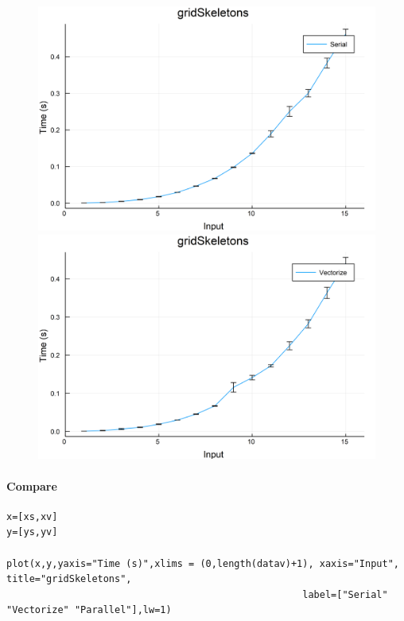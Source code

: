 \documentclass{article}
\begin{document}
\begin{figure}[h!]
\centering
\includegraphics[scale=0.06]{gridSkeletonsSer.png}
\includegraphics[scale=0.06]{gridSkeletonsVec.png}
\end{figure}

\paragraph{Compare}
\begin{flushleft}\small
\begin{list}{}{} \item
    \begin{Verbatim}[tabsize=4]
x=[xs,xv]
y=[ys,yv]

plot(x,y,yaxis="Time (s)",xlims = (0,length(datav)+1), xaxis="Input", title="gridSkeletons",
                                                    label=["Serial" "Vectorize" "Parallel"],lw=1)
   \end{Verbatim}
\end{list}
\end{flushleft}  
\end{document}
